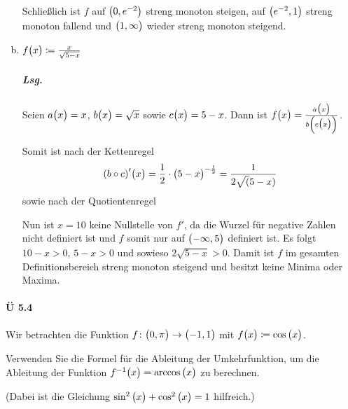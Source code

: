 \documentclass{scrreprt}
\begin{document}
\begin{enumerate}[(a)]
  Schließlich ist $f$ auf $\qty\big(0, e^{-2})$ streng monoton steigen,
  auf $\qty\big(e^{-2}, 1)$ streng monoton fallend und
  $\qty\big(1, \infty)$ wieder streng monoton steigend.

\newpage
\item $f\qty\big(x) \coloneqq \frac{x}{\sqrt{5 - x}}$

  \subparagraph{Lsg.} Seien $a\qty\big(x) = x$, $b\qty\big(x) = \sqrt{x}$ sowie
  $c\qty\big(x) = 5 - x$.
  Dann ist $f\qty\big(x) = \frac{a\qty\big(x)}{b\qty(c\qty\big(x))}$.

  Somit ist nach der Kettenregel
  \[
    \qty(b \circ c)'\qty\big(x) = \frac{1}{2} \cdot \qty\big(5 - x)^{-\frac{1}{2}}
    = \frac{1}{2\sqrt(5 - x)}
  \]
  sowie nach der Quotientenregel
  Nun ist $x = 10$ keine Nullstelle von $f'$, da die Wurzel für negative Zahlen
  nicht definiert ist und $f$ somit nur auf $\qty\big(-\infty, 5)$ definiert ist.
  Es folgt $10 - x > 0$, $5 - x > 0$ und sowieso $2\sqrt{5 - x} > 0$.
  Damit ist $f$ im gesamten Definitionsbereich streng monoton steigend und
  besitzt keine Minima oder Maxima.
\end{enumerate}

\newpage
\paragraph{Ü 5.4} Wir betrachten die Funktion
$f \colon \qty\big(0, \pi) \to \qty\big(-1, 1)$
mit $f\qty\big(x) \coloneqq \cos\qty\big(x)$.

Verwenden Sie die Formel für die Ableitung der Umkehrfunktion, um die
Ableitung der Funktion $f^{-1}\qty\big(x) = \arccos\qty\big(x)$ zu berechnen.

(Dabei ist die Gleichung $\sin^2\qty\big(x) + \cos^2\qty\big(x) = 1$ hilfreich.)
\end{document}
